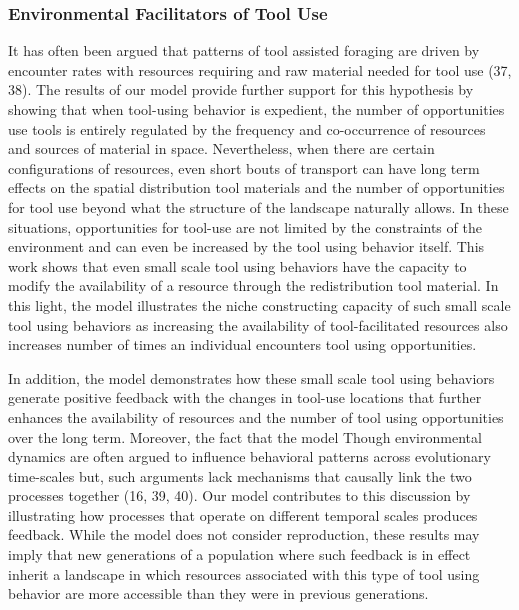 \documentclass[9pt,twocolumn,twoside,]{pnas-new}
\begin{document}
\hypertarget{environmental-facilitators-of-tool-use}{%
\subsubsection{Environmental Facilitators of Tool
Use}\label{environmental-facilitators-of-tool-use}}

It has often been argued that patterns of tool assisted foraging are
driven by encounter rates with resources requiring and raw material
needed for tool use (37, 38). The results of our model provide further
support for this hypothesis by showing that when tool-using behavior is
expedient, the number of opportunities use tools is entirely regulated
by the frequency and co-occurrence of resources and sources of material
in space. Nevertheless, when there are certain configurations of
resources, even short bouts of transport can have long term effects on
the spatial distribution tool materials and the number of opportunities
for tool use beyond what the structure of the landscape naturally
allows. In these situations, opportunities for tool-use are not limited
by the constraints of the environment and can even be increased by the
tool using behavior itself. This work shows that even small scale tool
using behaviors have the capacity to modify the availability of a
resource through the redistribution tool material. In this light, the
model illustrates the niche constructing capacity of such small scale
tool using behaviors as increasing the availability of tool-facilitated
resources also increases number of times an individual encounters tool
using opportunities.

In addition, the model demonstrates how these small scale tool using
behaviors generate positive feedback with the changes in tool-use
locations that further enhances the availability of resources and the
number of tool using opportunities over the long term. Moreover, the
fact that the model Though environmental dynamics are often argued to
influence behavioral patterns across evolutionary time-scales but, such
arguments lack mechanisms that causally link the two processes together
(16, 39, 40). Our model contributes to this discussion by illustrating
how processes that operate on different temporal scales produces
feedback. While the model does not consider reproduction, these results
may imply that new generations of a population where such feedback is in
effect inherit a landscape in which resources associated with this type
of tool using behavior are more accessible than they were in previous
generations.
\end{document}
